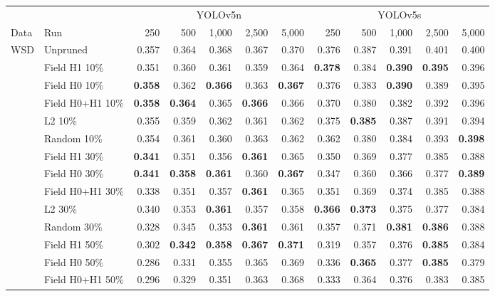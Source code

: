 \begin{tabular}{llrrrrrrrrrr}
\toprule
 & & \multicolumn{5}{c}{YOLOv5n} & \multicolumn{5}{c}{YOLOv5s} \\
\cmidrule(lr){3-7}\cmidrule(lr){8-12}
Data & Run & 250 & 500 & 1,000 & 2,500 & 5,000 & 250 & 500 & 1,000 & 2,500 & 5,000 \\
\midrule
WSD & Unpruned & 0.357 & 0.364 & 0.368 & 0.367 & 0.370 & 0.376 & 0.387 & 0.391 & 0.401 & 0.400 \\
 & Field H1 10\% & 0.351 & 0.360 & 0.361 & 0.359 & 0.364 & \textbf{0.378} & 0.384 & \textbf{0.390} & \textbf{0.395} & 0.396 \\
 & Field H0 10\% & \textbf{0.358} & 0.362 & \textbf{0.366} & 0.363 & \textbf{0.367} & 0.376 & 0.383 & \textbf{0.390} & 0.389 & 0.395 \\
 & Field H0+H1 10\% & \textbf{0.358} & \textbf{0.364} & 0.365 & \textbf{0.366} & 0.366 & 0.370 & 0.380 & 0.382 & 0.392 & 0.396 \\
 & L2 10\% & 0.355 & 0.359 & 0.362 & 0.361 & 0.362 & 0.375 & \textbf{0.385} & 0.387 & 0.391 & 0.394 \\
 & Random 10\% & 0.354 & 0.361 & 0.360 & 0.363 & 0.362 & 0.362 & 0.380 & 0.384 & 0.393 & \textbf{0.398} \\
\addlinespace[2pt]
 & Field H1 30\% & \textbf{0.341} & 0.351 & 0.356 & \textbf{0.361} & 0.365 & 0.350 & 0.369 & 0.377 & 0.385 & 0.388 \\
 & Field H0 30\% & \textbf{0.341} & \textbf{0.358} & \textbf{0.361} & 0.360 & \textbf{0.367} & 0.347 & 0.360 & 0.366 & 0.377 & \textbf{0.389} \\
 & Field H0+H1 30\% & 0.338 & 0.351 & 0.357 & \textbf{0.361} & 0.365 & 0.351 & 0.369 & 0.374 & 0.385 & 0.388 \\
 & L2 30\% & 0.340 & 0.353 & \textbf{0.361} & 0.357 & 0.358 & \textbf{0.366} & \textbf{0.373} & 0.375 & 0.377 & 0.384 \\
 & Random 30\% & 0.328 & 0.345 & 0.353 & \textbf{0.361} & 0.361 & 0.357 & 0.371 & \textbf{0.381} & \textbf{0.386} & 0.388 \\
\addlinespace[2pt]
 & Field H1 50\% & 0.302 & \textbf{0.342} & \textbf{0.358} & \textbf{0.367} & \textbf{0.371} & 0.319 & 0.357 & 0.376 & \textbf{0.385} & 0.384 \\
 & Field H0 50\% & 0.286 & 0.331 & 0.355 & 0.365 & 0.369 & 0.336 & \textbf{0.365} & 0.377 & \textbf{0.385} & 0.379 \\
 & Field H0+H1 50\% & 0.296 & 0.329 & 0.351 & 0.363 & 0.368 & 0.333 & 0.364 & 0.376 & 0.383 & 0.385 \\

\end{tabular}
